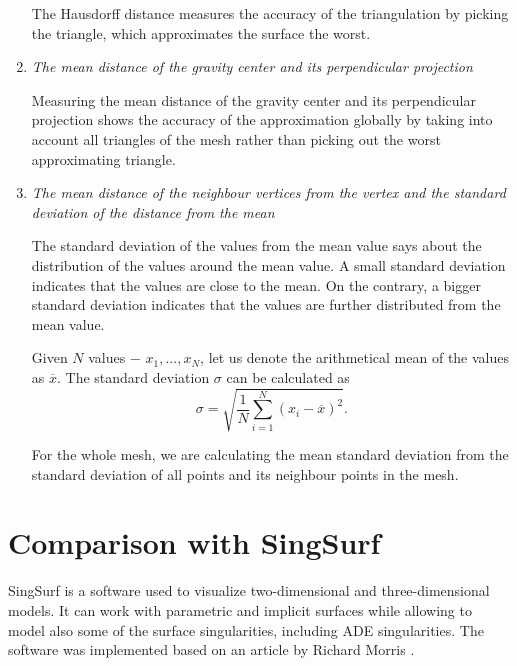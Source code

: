 \begin{enumerate}
    The Hausdorff distance measures the accuracy of the triangulation by picking the 
    triangle, which approximates the surface the worst.

    \item \textit{The mean distance of the gravity center and its perpendicular projection}
    
    Measuring the mean distance of the gravity center and its perpendicular projection shows the accuracy of the approximation globally by taking into
    account all triangles of the mesh rather than picking out the worst approximating 
    triangle.

    \item \textit{The mean distance of the neighbour vertices from the vertex and the standard deviation of the distance from the mean}

    The standard deviation of the values from the mean value says about the 
    distribution of the values around the mean value. A small standard deviation indicates
    that the values are close to the mean. On the contrary, a bigger standard deviation
    indicates that the values are further distributed from the mean value.

    \begin{definition}
        Given $N$ values $-$ $x_1, ..., x_N$, let us denote the arithmetical mean 
        of the values as $\overline{x}$. The standard deviation $\sigma$ can be calculated
        as
        \begin{equation}
            \sigma = \sqrt{\frac{1}{N} \sum\limits_{i=1}^{N}(x_i - \overline{x})^2}. 
        \end{equation}
    \end{definition}

    For the whole mesh, we are calculating the mean standard deviation from the 
    standard deviation of all points and its neighbour points in the mesh.
\end{enumerate}

\section{Comparison with SingSurf}
\label{sub4.2}

SingSurf \cite{morris2003client} is a software used to visualize two-dimensional
and three-dimensional models. It can work with parametric and implicit surfaces 
while allowing to model also some of the surface singularities, including
ADE singularities. The software was implemented based on an article by 
Richard Morris \cite{morris2003client}.

